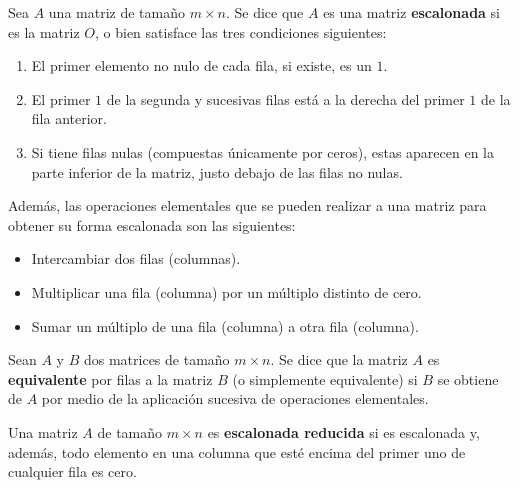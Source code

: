 \begin{definicion}
    Sea $A$ una matriz de tamaño $m \times n$. Se dice que $A$ es una matriz \textbf{escalonada} si es la matriz $O$, o bien satisface las tres condiciones siguientes:

    \begin{enumerate}
        \item El primer elemento no nulo de cada fila, si existe, es un $1$.
        \item El primer $1$ de la segunda y sucesivas filas está a la derecha del primer $1$ de la fila anterior.
        \item Si tiene filas nulas (compuestas únicamente por ceros), estas aparecen en la parte inferior de la matriz, justo debajo de las filas no nulas.
    \end{enumerate}

    Además, las operaciones elementales que se pueden realizar a una matriz para obtener su forma escalonada son las siguientes:

    \begin{itemize}
        \item Intercambiar dos filas (columnas).
        \item Multiplicar una fila (columna) por un múltiplo distinto de cero.
        \item Sumar un múltiplo de una fila (columna) a otra fila (columna).
    \end{itemize}
\end{definicion}

\begin{definicion}
    Sean $A$ y $B$ dos matrices de tamaño $m \times n$. Se dice que la matriz $A$ es \textbf{equivalente} por filas a la matriz $B$ (o simplemente equivalente) si $B$ se obtiene de $A$ por medio de la aplicación sucesiva de operaciones elementales.
\end{definicion}

\begin{definicion}
    Una matriz $A$ de tamaño $m \times n$ es \textbf{escalonada reducida} si es escalonada y, además, todo elemento en una columna que esté encima del primer uno de cualquier fila es cero.
\end{definicion}

